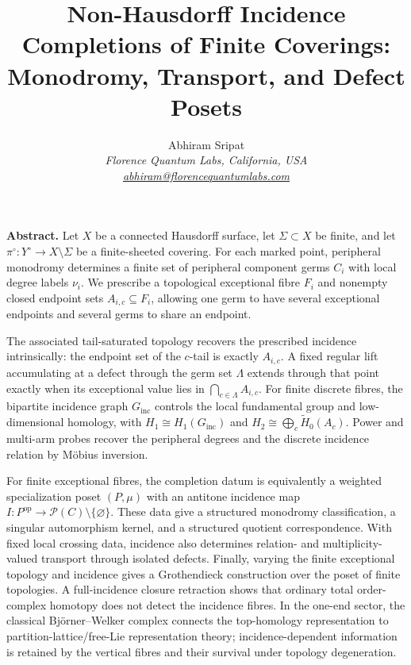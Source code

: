 \documentclass[11pt]{article}
\title{Non-Hausdorff Incidence Completions of Finite Coverings: Monodromy, Transport, and Defect Posets}
\author{
 Abhiram Sripat\\
 \textit{Florence Quantum Labs, California, USA}\\
 \href{mailto:abhiram@florencequantumlabs.com}{\textit{abhiram@florencequantumlabs.com}}
}
\date{}
\theoremstyle{plain}
\theoremstyle{definition}
\begin{document}
\pagestyle{empty}
\maketitle
\thispagestyle{empty}

\begin{tcolorbox}
\noindent\textbf{Abstract.}
Let $X$ be a connected Hausdorff surface, let $\Sigma\subset X$ be finite, and let
$\pi^\circ:Y^\circ\to X\setminus\Sigma$ be a finite-sheeted covering.  For each
marked point, peripheral monodromy determines a finite set of peripheral component
germs $C_i$ with local degree labels $\nu_i$.  We prescribe a topological exceptional
fibre $F_i$ and nonempty closed endpoint sets $A_{i,c}\subseteq F_i$, allowing one
germ to have several exceptional endpoints and several germs to share an endpoint.

The associated tail-saturated topology recovers the prescribed incidence intrinsically:
the endpoint set of the $c$-tail is exactly $A_{i,c}$.  A fixed regular lift accumulating
at a defect through the germ set $\Lambda$ extends through that point exactly when its
exceptional value lies in $\bigcap_{c\in\Lambda}A_{i,c}$.  For finite discrete fibres,
the bipartite incidence graph $G_{\mathrm{inc}}$ controls the local fundamental group
and low-dimensional homology, with
$H_1\cong H_1(G_{\mathrm{inc}})$ and
$H_2\cong\bigoplus_c\widetilde H_0(A_c)$.  Power and multi-arm probes recover the
peripheral degrees and the discrete incidence relation by M\"obius inversion.

For finite exceptional fibres, the completion datum is equivalently a weighted
specialization poset $(P,\mu)$ with an antitone incidence map
$I:P^{\mathrm{op}}\to\mathcal P(C)\setminus\{\varnothing\}$.  These data give a
structured monodromy classification, a singular automorphism kernel, and a structured
quotient correspondence.  With fixed local crossing data, incidence also determines
relation- and multiplicity-valued transport through isolated defects.  Finally, varying
the finite exceptional topology and incidence gives a Grothendieck construction over
the poset of finite topologies.  A full-incidence closure retraction shows that ordinary
total order-complex homotopy does not detect the incidence fibres.  In the one-end
sector, the classical Björner--Welker complex connects the top-homology representation
to partition-lattice/free-Lie representation theory; incidence-dependent information is
retained by the vertical fibres and their survival under topology degeneration.
\end{tcolorbox}
\end{document}
